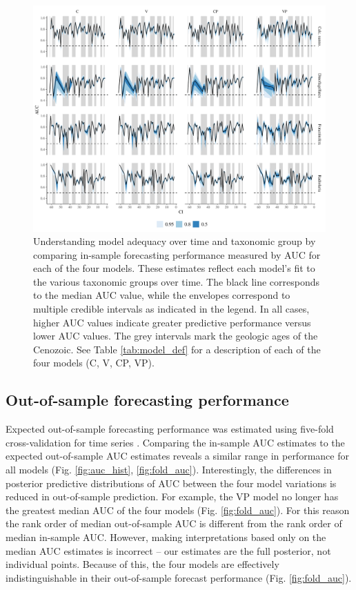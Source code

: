 \documentclass[12pt,letterpaper]{article}
\begin{document}
\begin{refsection}
\begin{figure}[ht]
 \centering
 \includegraphics[width=\textwidth,height=0.5\textheight,keepaspectratio=true]{../results/figure/auc_taxon_time_full}
 \caption{Understanding model adequacy over time and taxonomic group by comparing in-sample forecasting performance measured by AUC for each of the four models. These estimates reflect each model's fit to the various taxonomic groups over time. The black line corresponds to the median AUC value, while the envelopes correspond to multiple credible intervals as indicated in the legend. In all cases, higher AUC values indicate greater predictive performance versus lower AUC values. The grey intervals mark the geologic ages of the Cenozoic. See Table \ref{tab:model_def} for a description of each of the four models (C, V, CP, VP).}
 \label{fig:auc_taxon_time}
\end{figure}




\subsection{Out-of-sample forecasting performance}

Expected out-of-sample forecasting performance was estimated using five-fold cross-validation for time series \citep{Arlot2010,Bergmeir2016}. Comparing the in-sample AUC estimates to the expected out-of-sample AUC estimates reveals a similar range in performance for all models (Fig. \ref{fig:auc_hist}, \ref{fig:fold_auc}). Interestingly, the differences in posterior predictive distributions of AUC between the four model variations is reduced in out-of-sample prediction. For example, the VP model no longer has the greatest median AUC of the four models (Fig. \ref{fig:fold_auc}). For this reason the rank order of median out-of-sample AUC is different from the rank order of median in-sample AUC. However, making interpretations based only on the median AUC estimates is incorrect -- our estimates are the full posterior, not individual points. Because of this, the four models are effectively indistinguishable in their out-of-sample forecast performance (Fig. \ref{fig:fold_auc}).


\end{refsection}
\end{document}
